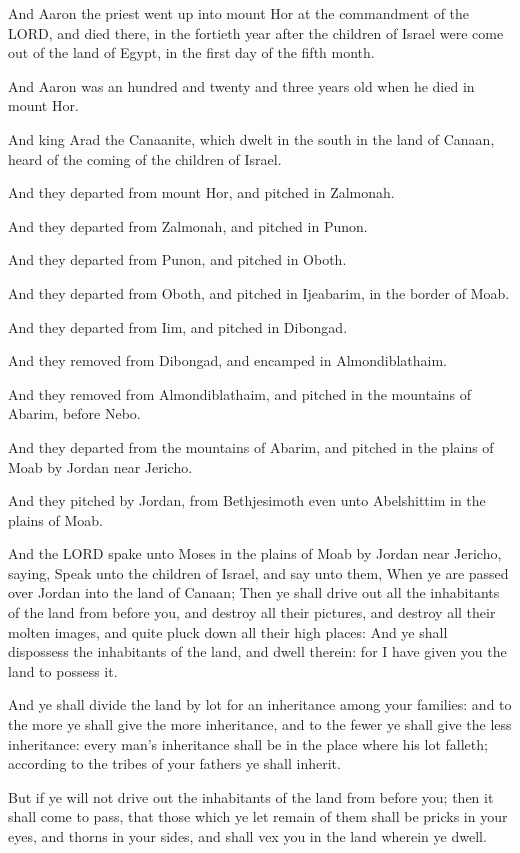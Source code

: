 \verse And Aaron the priest went up into mount Hor at the commandment
of the LORD, and died there, in the fortieth year after the children
of Israel were come out of the land of Egypt, in the first day of the
fifth month.

\verse And Aaron was an hundred and twenty and three years old when he
died in mount Hor.

\verse And king Arad the Canaanite, which dwelt in the south in the
land of Canaan, heard of the coming of the children of Israel.

\verse And they departed from mount Hor, and pitched in Zalmonah.

\verse And they departed from Zalmonah, and pitched in Punon.

\verse And they departed from Punon, and pitched in Oboth.

\verse And they departed from Oboth, and pitched in Ijeabarim, in the
border of Moab.

\verse And they departed from Iim, and pitched in Dibongad.

\verse And they removed from Dibongad, and encamped in Almondiblathaim.

\verse And they removed from Almondiblathaim, and pitched in the
mountains of Abarim, before Nebo.

\verse And they departed from the mountains of Abarim, and pitched in
the plains of Moab by Jordan near Jericho.

\verse And they pitched by Jordan, from Bethjesimoth even unto
Abelshittim in the plains of Moab.

\verse And the LORD spake unto Moses in the plains of Moab by Jordan
near Jericho, saying, \verse Speak unto the children of Israel, and say
unto them, When ye are passed over Jordan into the land of Canaan;
\verse Then ye shall drive out all the inhabitants of the land from
before you, and destroy all their pictures, and destroy all their
molten images, and quite pluck down all their high places: \verse And
ye shall dispossess the inhabitants of the land, and dwell therein:
for I have given you the land to possess it.

\verse And ye shall divide the land by lot for an inheritance among
your families: and to the more ye shall give the more inheritance, and
to the fewer ye shall give the less inheritance: every man's
inheritance shall be in the place where his lot falleth; according to
the tribes of your fathers ye shall inherit.

\verse But if ye will not drive out the inhabitants of the land from
before you; then it shall come to pass, that those which ye let remain
of them shall be pricks in your eyes, and thorns in your sides, and
shall vex you in the land wherein ye dwell.

